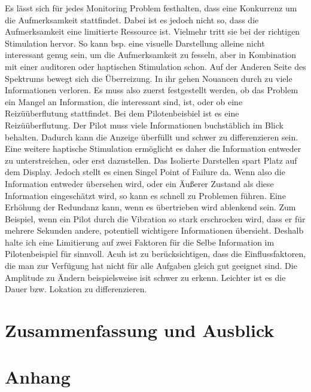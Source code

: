\documentclass{llncs}					%
\begin{document}
Es lässt sich für jedes Monitoring Problem festhalten, dass eine Konkurrenz um die Aufmerksamkeit stattfindet. Dabei ist es jedoch nicht so, dass die Aufmerksamkeit eine limitierte Ressource ist. Vielmehr tritt sie bei der richtigen Stimulation hervor. So kann bsp. eine visuelle Darstellung alleine nicht interessant genug sein, um die Aufmerksamkeit zu fesseln, aber in Kombination mit einer auditoren oder haptischen Stimulation schon. Auf der Anderen Seite des Spektrums bewegt sich die Überreizung. In ihr gehen Nouancen durch zu viele Informationen verloren.
Es muss also zuerst festgestellt werden, ob das Problem ein Mangel an Information, die interessant sind, ist, oder ob eine Reizüüberflutung stattfindet. Bei dem Pilotenbeisbiel ist es eine Reizüüberflutung. Der Pilot muss viele Informationen buchstäblich im Blick behalten. Dadurch kann die Anzeige überfüllt und schwer zu differenzieren sein. Eine weitere haptische Stimulation ermöglicht es daher die Information entweder zu unterstreichen, oder erst dazustellen. Das Isolierte Darstellen spart Platz auf dem Display. Jedoch stellt es einen Singel Point of Failure da. Wenn also die Information entweder übersehen wird, oder ein Äußerer Zustand als diese Information eingeschätzt wird, so kann es schnell zu Problemen führen. Eine Erhöhung der Redundanz kann, wenn es übertrieben wird ablenkend sein. Zum Beispiel, wenn ein Pilot durch die Vibration so stark erschrocken wird, dass er für mehrere Sekunden andere, potentiell wichtigere Informationen übersieht. Deshalb halte ich eine Limitierung auf zwei Faktoren für die Selbe Information im Pilotenbeispiel für sinnvoll. Acuh ist zu berücksichtigen, dass die Einflussfaktoren, die man zur Verfügung hat nicht für alle Aufgaben gleich gut geeignet sind. Die Amplitude zu Ändern beispielsweise isit schwer zu erkenn. Leichter ist es die Dauer bzw. Lokation zu differenzieren.
\newpage
\section{Zusammenfassung und Ausblick}

\newpage
\section{Anhang}
\end{document}
